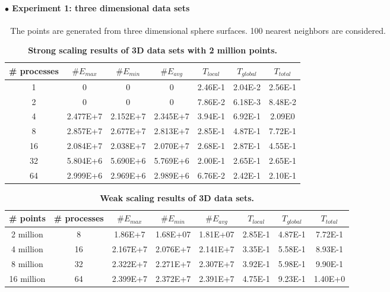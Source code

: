 \documentclass[12pt]{article}
\begin{document}
\paragraph{$\bullet$ Experiment 1: three dimensional data sets}
$ $\newline
$ $\newline
\indent The points are generated from three dimensional sphere surfaces. 100 nearest neighbors are considered.
$ $\newline
\renewcommand{\arraystretch}{1.7}
\begin{table}[h]
\centering
    \caption{\textbf{Strong scaling results of 3D data sets with 2 million points.} }
	\label{2M3D}
\begin{tabular}{ccccccc}
    \hline %
\# processes  &$\# E_{max}$   &$\# E_{min}$ &$\# E_{avg}$  &$T_{local}$  &$T_{global}$  &$T_{total}$\\
\hline\hline
1  &0  &0  &0  &2.46E-1   &2.04E-2   &2.56E-1 \\
2  &0  &0  &0   &7.86E-2 &6.18E-3  &8.48E-2 \\
4   &2.477E+7   &2.152E+7   &2.345E+7  &3.94E-1   &6.92E-1 &2.09E0 \\
8  &2.857E+7   &2.677E+7   &2.813E+7   &2.85E-1   &4.87E-1 &7.72E-1 \\
16 &2.084E+7   &2.038E+7   &2.070E+7   &2.68E-1   &2.87E-1  &4.55E-1 \\
32  &5.804E+6   &5.690E+6   &5.769E+6   &2.00E-1   &2.65E-1 &2.65E-1 \\
64   &2.999E+6   &2.969E+6   &2.989E+6  &6.76E-2   &2.42E-1 &2.10E-1 \\
\hline
    \end{tabular}
\end{table}

\renewcommand{\arraystretch}{1.7}
\begin{table}[h]
\centering
    \caption{\textbf{Weak scaling results of 3D data sets.} }
	\label{3Dweak}
\begin{tabular}{cccccccc}
    \hline %
\# points &\# processes  &$\# E_{max}$   &$\# E_{min}$ &$\# E_{avg}$  &$T_{local}$  &$T_{global}$  &$T_{total}$\\
\hline\hline
2 million &8 &1.86E+7    &1.68E+07    &1.81E+07    &2.85E-1    &4.87E-1    &7.72E-1\\
4 million &16  &2.167E+7   &2.076E+7   &2.141E+7  &3.35E-1   &5.58E-1 &8.93E-1\\
8 million &32  &2.322E+7   &2.271E+7   &2.307E+7  &3.92E-1   &5.98E-1 &9.90E-1 \\
16 million &64  &2.399E+7   &2.372E+7   &2.391E+7  &4.75E-1   &9.23E-1 &1.40E+0\\
\hline
    \end{tabular}
\end{table}
\end{document}
